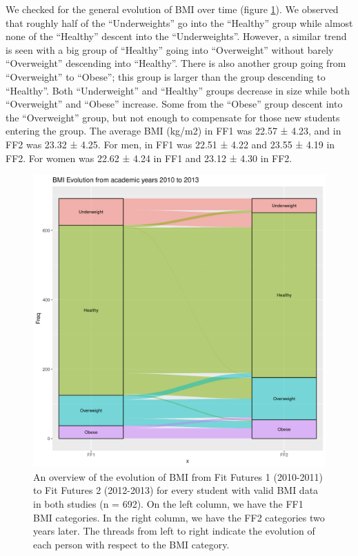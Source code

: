 We checked for the general evolution of BMI over time (figure \ref{figure:Results1general}). We observed that roughly half of the “Underweights” go into the “Healthy” group while almost none of the “Healthy” descent into the “Underweights”. However, a similar trend is seen with a big group of “Healthy” going into “Overweight” without barely “Overweight” descending into “Healthy”. There is also another group going from “Overweight” to “Obese”; this group is larger than the group descending to “Healthy”. Both “Underweight” and “Healthy” groups decrease in size while both “Overweight” and “Obese” increase. Some from the “Obese” group descent into the “Overweight” group, but not enough to compensate for those new students entering the group. The average BMI (kg/m2) in FF1 was 22.57 ± 4.23, and in FF2 was 23.32 ± 4.25. For men, in FF1 was 22.51 ± 4.22 and 23.55 ± 4.19 in FF2. For women was 22.62 ± 4.24 in FF1 and 23.12 ± 4.30 in FF2.

    \begin{figure}[ht]
        \centering
            \includegraphics[width=0.75\linewidth]{figures/Results/ResultOne/generalEvolution.png } 
        \caption{An overview of the evolution of BMI from Fit Futures 1 (2010-2011) to Fit Futures 2 (2012-2013) for every student with valid BMI data in both studies (n = 692). On the left column, we have the FF1 BMI categories. In the right column, we have the FF2 categories two years later. The threads from left to right indicate the evolution of each person with respect to the BMI category.}
        \label{figure:Results1general}
    \end{figure}

